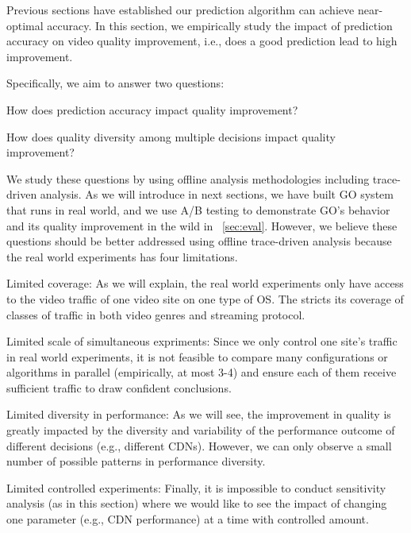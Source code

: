 \label{sec:improvement}

Previous sections have established our prediction algorithm can achieve near-optimal accuracy. In this section, we empirically study the impact of prediction accuracy on video quality improvement, i.e., does a good prediction lead to high improvement. 

Specifically, we aim to answer two questions:
\begin{packedenumerate}
	\item How does prediction accuracy impact quality improvement?
	\item How does quality diversity among multiple decisions impact quality improvement? 
\end{packedenumerate}

We study these questions by using offline analysis methodologies including trace-driven analysis. As we will introduce in next sections, we have built GO system that runs in real world, and we use A/B testing  to demonstrate GO's behavior and its quality improvement in the wild in \Section~\ref{sec:eval}. However, we believe these questions should be better addressed using offline trace-driven analysis because the real world experiments has four limitations.
\begin{packedenumerate}
	\item Limited coverage: As we will explain, the real world experiments only have access to the video traffic of one video site on one type of OS. The stricts its coverage of classes of traffic in both video genres and streaming protocol.
	\item Limited scale of simultaneous expriments: Since we only control one site's traffic in real world experiments, it is not feasible to compare many configurations or algorithms in parallel (empirically, at most 3-4) and ensure each of them receive sufficient traffic to draw confident conclusions.
	\item Limited diversity in performance: As we will see, the improvement in quality is greatly impacted by the diversity and variability of the performance outcome of different decisions (e.g., different CDNs). However, we can only observe a small number of possible patterns in performance diversity.
	\item Limited controlled experiments: Finally, it is impossible to conduct sensitivity analysis (as in this section) where we would like to see the impact of changing one parameter (e.g., CDN performance) at a time with controlled amount.
\end{packedenumerate}


